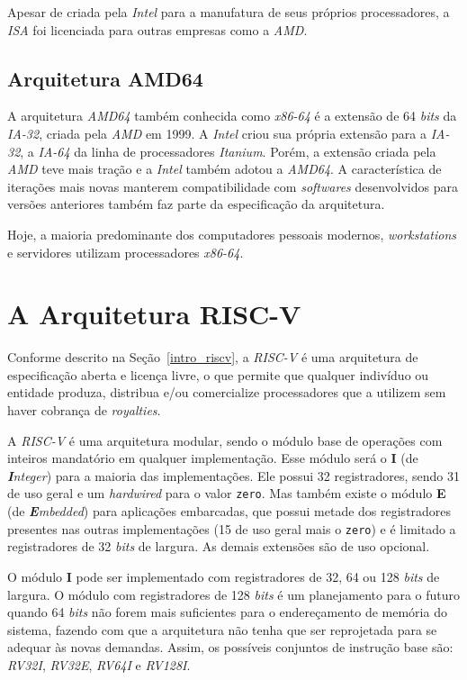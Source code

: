     { Apesar de criada pela \textit{Intel} para a manufatura de seus próprios
        processadores, a \textit{ISA} foi licenciada para outras empresas como a
        \textit{AMD}.
    }

    \subsection{Arquitetura AMD64}
    { A arquitetura \textit{AMD64} também conhecida como \textit{x86-64} é a
        extensão de 64 \textit{bits} da \textit{IA-32}, criada pela \textit{AMD}
        em 1999. A \textit{Intel} criou sua própria extensão para a \textit{IA-32},
        a \textit{IA-64} da linha de processadores \textit{Itanium}. Porém, a
        extensão criada pela \textit{AMD} teve mais tração e a \textit{Intel}
        também adotou a \textit{AMD64}. A característica de iterações mais novas
        manterem compatibilidade com \textit{softwares} desenvolvidos para versões
        anteriores também faz parte da especificação da arquitetura.
    }

    { Hoje, a maioria predominante dos computadores pessoais modernos,
        \textit{workstations} e servidores utilizam processadores \textit{x86-64}.
    }

\section{A Arquitetura RISC-V}\label{riscv_basic_arch}
{ Conforme descrito na Seção~\ref{intro_riscv}, a \textit{RISC-V} é uma
    arquitetura de especificação aberta e licença livre, o que permite que
    qualquer indivíduo ou entidade produza, distribua e/ou comercialize
    processadores que a utilizem sem haver cobrança de \textit{royalties}.
}

{ A \textit{RISC-V} é uma arquitetura modular, sendo o módulo base de
    operações com inteiros mandatório em qualquer implementação.
    Esse módulo será o \textbf{I} (de \textit{\textbf{I}nteger}) para a
    maioria das implementações. Ele possui 32 registradores, sendo 31 de uso
    geral e um \textit{hardwired} para o valor \texttt{zero}. Mas também existe
    o módulo \textbf{E} (de \textit{\textbf{E}mbedded}) para aplicações embarcadas,
    que possui metade dos registradores presentes nas outras implementações
    (15 de uso geral mais o \texttt{zero}) e é limitado a registradores de
    32 \textit{bits} de largura. As demais extensões são de uso opcional.
}

{ O módulo \textbf{I} pode ser implementado com registradores de 32, 64 ou
    128 \textit{bits} de largura. O módulo com registradores de 128
    \textit{bits} é um planejamento para o futuro quando 64 \textit{bits}
    não forem mais suficientes para o endereçamento de memória do sistema,
    fazendo com que a arquitetura não tenha que ser reprojetada para se
    adequar às novas demandas. Assim, os possíveis conjuntos de instrução
    base são: \textit{RV32I}, \textit{RV32E}, \textit{RV64I} e \textit{RV128I}.
}

